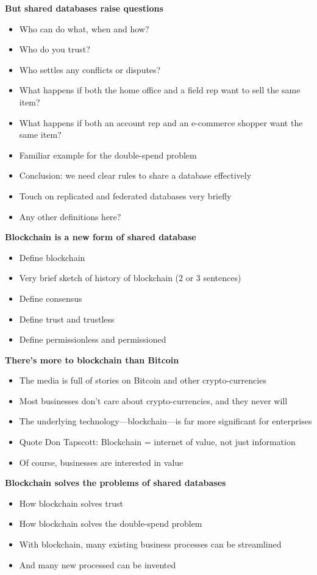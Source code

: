 \textbf{But shared databases raise questions}
\begin{itemize}
\item Who can do what, when and how?
\item Who do you trust? 
\item Who settles any conflicts or disputes? 
\item What happens if both the home office and a field rep want to sell the same item? 
\item What happens if both an account rep and an e-commerce shopper want the same item?
\item Familiar example for the double-spend problem 
\item Conclusion: we need clear rules to share a database effectively
\item Touch on replicated and federated databases very briefly 
\item Any other definitions here?
\end{itemize}

\textbf{Blockchain is a new form of shared database}
\begin{itemize}
\item Define blockchain
\item Very brief sketch of history of blockchain (2 or 3 sentences)
\item Define consensus
\item Define trust and trustless
\item Define permissionless and permissioned
\end{itemize}

\textbf{There's more to blockchain than Bitcoin}
\begin{itemize}
\item The media is full of stories on Bitcoin and other crypto-currencies
\item Most businesses don't care about crypto-currencies, and they never will
\item The underlying technology---blockchain---is far more significant for enterprises 
\item Quote Don Tapscott: Blockchain = internet of value, not just information
\item Of course, businesses are interested in value
\end{itemize}

\textbf{Blockchain solves the problems of shared databases}
\begin{itemize}
\item How blockchain solves trust
\item How blockchain solves the double-spend problem
\item With blockchain, many existing business processes can be streamlined
\item And many new processed can be invented
\end{itemize}

